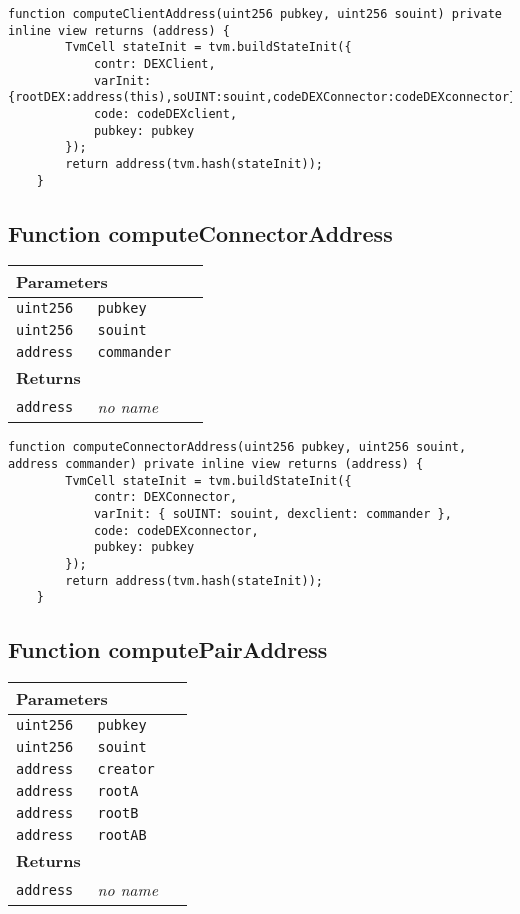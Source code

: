 \begin{lstlisting}[firstnumber=108]
	function computeClientAddress(uint256 pubkey, uint256 souint) private inline view returns (address) {
		TvmCell stateInit = tvm.buildStateInit({
			contr: DEXClient,
			varInit: {rootDEX:address(this),soUINT:souint,codeDEXConnector:codeDEXconnector},
			code: codeDEXclient,
			pubkey: pubkey
		});
		return address(tvm.hash(stateInit));
	}
\end{lstlisting}

\subsection{Function computeConnectorAddress}


\ifsoltables
\noindent\begin{tabular}{|l|l|p{5cm}|}\hline
\multicolumn{3}{|l|}{\bf Parameters}\\\hline
\tt uint256 & \tt pubkey &\\\hline
\tt uint256 & \tt souint &\\\hline
\tt address & \tt commander &\\\hline
\multicolumn{3}{|l|}{\bf Returns}\\\hline
\tt address & {\em no name} &\\\hline
\end{tabular}
\fi

\vspace{2cm}

\begin{lstlisting}[firstnumber=223]
	function computeConnectorAddress(uint256 pubkey, uint256 souint, address commander) private inline view returns (address) {
		TvmCell stateInit = tvm.buildStateInit({
			contr: DEXConnector,
			varInit: { soUINT: souint, dexclient: commander },
			code: codeDEXconnector,
			pubkey: pubkey
		});
		return address(tvm.hash(stateInit));
	}
\end{lstlisting}

\subsection{Function computePairAddress}


\ifsoltables
\noindent\begin{tabular}{|l|l|p{5cm}|}\hline
\multicolumn{3}{|l|}{\bf Parameters}\\\hline
\tt uint256 & \tt pubkey &\\\hline
\tt uint256 & \tt souint &\\\hline
\tt address & \tt creator &\\\hline
\tt address & \tt rootA &\\\hline
\tt address & \tt rootB &\\\hline
\tt address & \tt rootAB &\\\hline
\multicolumn{3}{|l|}{\bf Returns}\\\hline
\tt address & {\em no name} &\\\hline
\end{tabular}
\fi


